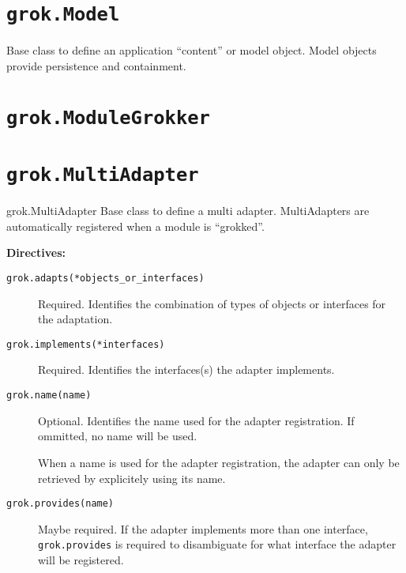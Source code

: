 \documentclass[10pt,a4paper,english]{manual}
\begin{document}

\section{\texttt{grok.Model}}

Base class to define an application ``content'' or model object. Model objects
provide persistence and containment.



\section{\texttt{grok.ModuleGrokker}}



\section{\texttt{grok.MultiAdapter}}
\begin{classdesc*}{grok.MultiAdapter}
Base class to define a multi adapter. MultiAdapters are automatically registered
when a module is ``grokked''.

\textbf{Directives:}
\begin{description}
\item[{\texttt{grok.adapts(*objects{\_}or{\_}interfaces)}}] %

Required. Identifies the combination of types of objects or interfaces for the
adaptation.

\item[{\texttt{grok.implements(*interfaces)}}] %

Required. Identifies the interfaces(s) the adapter implements.

\item[{\texttt{grok.name(name)}}] %

Optional. Identifies the name used for the adapter registration. If ommitted, no
name will be used.

When a name is used for the adapter registration, the adapter can only be
retrieved by explicitely using its name.

\item[{\texttt{grok.provides(name)}}] %

Maybe required. If the adapter implements more than one interface,
\texttt{grok.provides} is required to disambiguate for what interface the adapter
will be registered.

\end{description}
\end{classdesc*}
\end{document}
